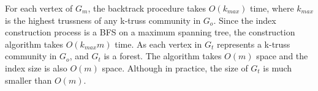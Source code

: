 
For each vertex of $G_m$, the backtrack procedure takes $O(k_{max})$ time, where $k_{max}$ is the highest trussness of any k-truss community in $G_o$. Since the index construction process is a BFS on a maximum spanning tree, the \treeindex{} construction algorithm takes $O(k_{max}m)$ time. As each vertex in $G_t$ represents a k-truss community in $G_o$, and $G_t$ is a forest. The algorithm takes $O(m)$ space and the index size is also $O(m)$ space. Although in practice, the size of $G_t$ is much smaller than $O(m)$.

%

